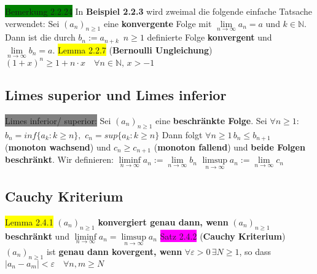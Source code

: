 \documentclass[landscape, 10pt]{article}
\newcommand{\N}{\mathbb{N}}
\begin{document}
\begin{multicols}{3}
\colorbox{green}{Bemerkung 2.2.24} In \textbf{Beispiel 2.2.3} wird zweimal die 
                folgende einfache Tatsache verwendet: Sei 
                \textcolor{NavyBlue}{$(a_n)_{n\geqslant1}$} eine 
         \textbf{konvergente} Folge mit 
                \textcolor{NavyBlue}{$\lim\limits_{n\to\infty}a_n=a$}
                und 
                \textcolor{NavyBlue}{$k\in\N$}. Dann ist die durch 
                \textcolor{NavyBlue}{$b_n:=a_{n+k}\enspace n\geqslant1$} definierte Folge 
         \textbf{konvergent} und 
                \textcolor{NavyBlue}{$\lim\limits_{n\to\infty}b_n=a$}.
\colorbox{yellow}{Lemma 2.2.7} (\textbf{Bernoulli Ungleichung}) 
                \textcolor{NavyBlue}{
                $(1+x)^n\geqslant 1+n\cdot x \quad\forall n\in\N,\, x>-1$}
\subsection{Limes superior und Limes inferior}
\colorbox{gray}{Limes inferior/ superior:} Sei \textcolor{NavyBlue}{$(a_n)_{n\geqslant 1}$}
                eine \textbf{beschränkte Folge}. Sei 
                \textcolor{NavyBlue}{$\forall n\geqslant1$: $b_n=inf\{a_k:k\geqslant n\},$
         $c_n=sup\{a_k:k\geqslant n\}$} Dann folgt 
                \textcolor{NavyBlue}{$\forall n\geqslant1\,b_n\leqslant b_{n+1}$} 
                (\textbf{monoton wachsend}) und 
                \textcolor{NavyBlue}{$c_n\geqslant c_{n+1}$} (\textbf{monoton fallend}) 
         und \textbf{beide Folgen beschränkt}. Wir definieren: 
                \textcolor{NavyBlue}{
                $\liminf\limits_{n\to\infty}a_n:=\lim\limits_{n\to\infty}b_n$ \qquad
                $\limsup\limits_{n\to\infty}a_n:=\lim\limits_{n\to\infty}c_n$}
\subsection{Cauchy Kriterium}
\colorbox{yellow}{Lemma 2.4.1} $(a_n)_{n\geqslant1}$ \textbf{konvergiert genau dann, wenn} 
                \textcolor{NavyBlue}{$(a_n)_{n\geqslant1}$} \textbf{beschränkt} und 
                \textcolor{NavyBlue}{
                $\liminf\limits_{n\to\infty}a_n=\limsup\limits_{n\to\infty}a_n$}
\colorbox{magenta}{Satz 2.4.2} (\textbf{Cauchy Kriterium}) $(a_n)_{n\geqslant1}$ ist
                \textbf{genau dann kovergent, wenn} 
                \textcolor{NavyBlue}{$\forall\varepsilon >0\,\exists N\geqslant1$}, 
         so dass 
                \textcolor{NavyBlue}{$|a_n-a_m|<\varepsilon\quad\forall n,m\geqslant N$}

\end{multicols}
\end{document}
